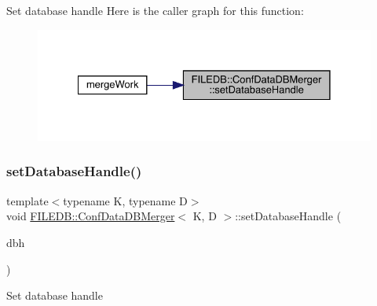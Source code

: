 Set database handle Here is the caller graph for this function\+:
\nopagebreak
\begin{figure}[H]
\begin{center}
\leavevmode
\includegraphics[width=328pt]{db/d60/classFILEDB_1_1ConfDataDBMerger_aba7a50569bcdc1beca3b82536fa5922b_icgraph}
\end{center}
\end{figure}
\mbox{\label{classFILEDB_1_1ConfDataDBMerger_aba7a50569bcdc1beca3b82536fa5922b}} 
\subsubsection{\texorpdfstring{setDatabaseHandle()}{setDatabaseHandle()}\hspace{0.1cm}{\footnotesize\ttfamily [2/3]}}
{\footnotesize\ttfamily template$<$typename K, typename D$>$ \\
void \mbox{\hyperlink{classFILEDB_1_1ConfDataDBMerger}{F\+I\+L\+E\+D\+B\+::\+Conf\+Data\+D\+B\+Merger}}$<$ K, D $>$\+::set\+Database\+Handle (\begin{DoxyParamCaption}\item[{\mbox{\hyperlink{classFILEDB_1_1AllConfStoreDB}{All\+Conf\+Store\+DB}}$<$ K, D $>$ $\ast$}]{dbh }\end{DoxyParamCaption})\hspace{0.3cm}{\ttfamily [inline]}}

Set database handle \mbox{\label{classFILEDB_1_1ConfDataDBMerger_aba7a50569bcdc1beca3b82536fa5922b}} 
